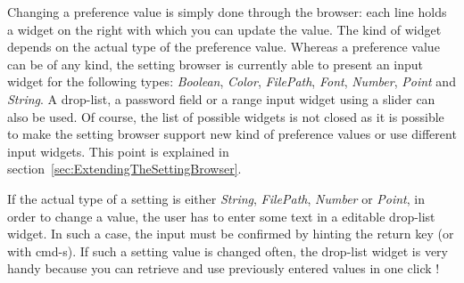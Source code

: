 \documentclass[a4paper,10pt,twoside]{book}
\begin{document}
Changing a preference value is simply done through the browser: each line holds a widget on the right with which you can update the value. The kind of widget depends on the actual type of the preference value. Whereas a preference value can be of any kind, the setting browser is currently able to present an input widget for the following types: \textit{Boolean}, \textit{Color}, \textit{FilePath}, \textit{Font}, \textit{Number}, \textit{Point} and \textit{String}. A drop-list, a password field or a range input widget using a slider can also be used. Of course, the list of possible widgets is not closed as it is possible to make the setting browser support new kind of preference values or use different input widgets. This point is explained in section~\ref{sec:ExtendingTheSettingBrowser}.

If the actual type of a setting is either \textit{String}, \textit{FilePath}, \textit{Number} or \textit{Point}, in order to change a value, the user has to enter some text in a editable drop-list widget. In such a case, the input must be confirmed by hinting the return key (or with cmd-s). If such a setting value is changed often, the drop-list widget is very handy because you can retrieve and use previously entered values in one click !
\end{document}
